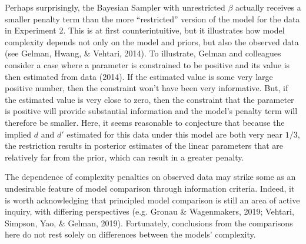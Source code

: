 \documentclass[
  english,
  man,floatsintext]{apa6}
\begin{document}
Perhaps surprisingly, the Bayesian Sampler with unrestricted \(\beta\) actually receives a smaller penalty term than the more ``restricted'' version of the model for the data in Experiment 2. This is at first counterintuitive, but it illustrates how model complexity depends not only on the model and priors, but also the observed data (see Gelman, Hwang, \& Vehtari, 2014). To illustrate, Gelman and colleagues consider a case where a parameter is constrained to be positive and its value is then estimated from data (2014). If the estimated value is some very large positive number, then the constraint won't have been very informative. But, if the estimated value is very close to zero, then the constraint that the parameter is positive will provide substantial information and the model's penalty term will therefore be smaller. Here, it seems reasonable to conjecture that because the implied \(d\) and \(d'\) estimated for this data under this model are both very near \(1/3\), the restriction results in posterior estimates of the linear parameters that are relatively far from the prior, which can result in a greater penalty.

The dependence of complexity penalties on observed data may strike some as an undesirable feature of model comparison through information criteria. Indeed, it is worth acknowledging that principled model comparison is still an area of active inquiry, with differing perspectives (e.g. Gronau \& Wagenmakers, 2019; Vehtari, Simpson, Yao, \& Gelman, 2019). Fortunately, conclusions from the comparisons here do not rest solely on differences between the models' complexity.
\end{document}
